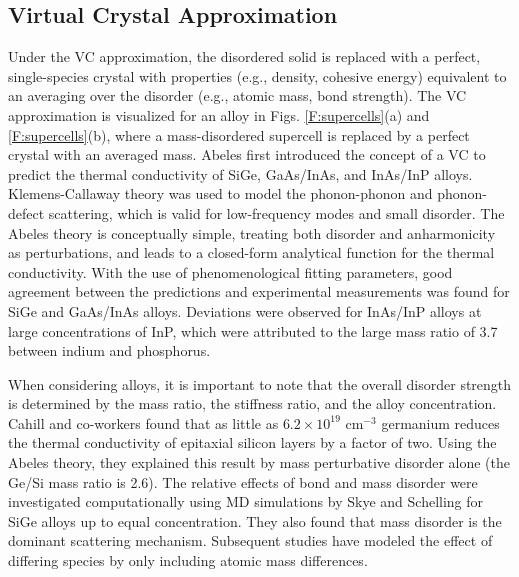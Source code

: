 \documentclass[12pt,twocolumn,iop]{/usr/share/texmf/tex/latex/iop/iopart}[/usr/share/texmf/tex/latex/iop/]
\begin{document}

\subsection{\label{S:Virtual Crystal}Virtual Crystal Approximation}

Under the VC approximation, the disordered solid is replaced with 
a perfect, single-species crystal with properties (e.g., density, 
cohesive energy) equivalent to an averaging over the disorder 
(e.g., atomic mass, bond strength).\cite{abeles_lattice_1963}
The VC approximation is visualized for an alloy in Figs. 
\ref{F:supercells}(a) and \ref{F:supercells}(b), where 
a mass-disordered supercell is replaced by a perfect 
crystal with an averaged mass. 
Abeles first introduced the concept of a VC to predict the
thermal conductivity of SiGe, GaAs/InAs, and InAs/InP alloys.
\cite{abeles_lattice_1963} Klemens-Callaway theory was used to model 
the phonon-phonon and phonon-defect scattering, 
which is valid for low-frequency modes and small disorder.
\cite{abeles_lattice_1963,klemens_scattering_1955,klemens_thermal_1957,callaway_model_1959,mattis_phonon_1957,kamitakahara_vibrations_1974} 
The Abeles theory is conceptually simple, treating both
disorder and anharmonicity as perturbations, and leads to 
a closed-form analytical function for the thermal conductivity.
With the use of phenomenological  
fitting parameters, good agreement between the predictions and 
experimental measurements 
was found for SiGe and GaAs/InAs alloys. Deviations were observed 
for InAs/InP alloys at large concentrations of 
InP, which were attributed to the large mass ratio of 3.7 between 
indium and phosphorus.\cite{abeles_lattice_1963}

When considering alloys, it is important to note that 
the overall disorder strength is determined by the mass ratio, 
the stiffness ratio, and the alloy concentration.
Cahill and co-workers found that as little as 
$6.2\times10^{19}$ cm$^{-3}$ germanium reduces the thermal conductivity 
of epitaxial silicon layers by a factor of two.
\cite{cahill_thermal_2004}  
Using the Abeles theory, they explained this result 
by mass perturbative disorder alone (the Ge/Si mass ratio is 2.6).
\cite{cahill_thermal_2004,cahill_thermal_2005} 
The relative effects of bond and mass disorder were investigated 
computationally using MD simulations by Skye and 
Schelling for SiGe alloys up to equal concentration.
\cite{skye_thermal_2008} They also found that mass disorder is 
the dominant scattering mechanism. Subsequent studies have modeled the 
effect of differing species by only including 
atomic mass differences.\cite{landry_thermal_2009,tian_enhancing_2012}
\end{document}
